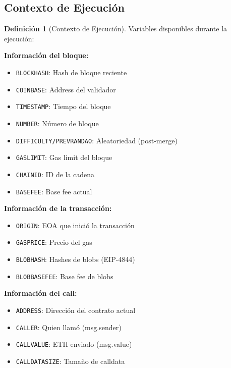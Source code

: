 \documentclass[11pt,a4paper,twoside,openright]{book}
\theoremstyle{definition}
\newtheorem{definition}{Definición}[chapter]
\theoremstyle{plain}
\theoremstyle{remark}
\begin{document}
\subsection{Contexto de Ejecución}

\begin{definition}[Contexto de Ejecución]
Variables disponibles durante la ejecución:

\textbf{Información del bloque:}
\begin{itemize}
    \item \texttt{BLOCKHASH}: Hash de bloque reciente
    \item \texttt{COINBASE}: Address del validador
    \item \texttt{TIMESTAMP}: Tiempo del bloque
    \item \texttt{NUMBER}: Número de bloque
    \item \texttt{DIFFICULTY/PREVRANDAO}: Aleatoriedad (post-merge)
    \item \texttt{GASLIMIT}: Gas limit del bloque
    \item \texttt{CHAINID}: ID de la cadena
    \item \texttt{BASEFEE}: Base fee actual
\end{itemize}

\textbf{Información de la transacción:}
\begin{itemize}
    \item \texttt{ORIGIN}: EOA que inició la transacción
    \item \texttt{GASPRICE}: Precio del gas
    \item \texttt{BLOBHASH}: Hashes de blobs (EIP-4844)
    \item \texttt{BLOBBASEFEE}: Base fee de blobs
\end{itemize}

\textbf{Información del call:}
\begin{itemize}
    \item \texttt{ADDRESS}: Dirección del contrato actual
    \item \texttt{CALLER}: Quien llamó (msg.sender)
    \item \texttt{CALLVALUE}: ETH enviado (msg.value)
    \item \texttt{CALLDATASIZE}: Tamaño de calldata
\end{itemize}
\end{definition}
\end{document}
